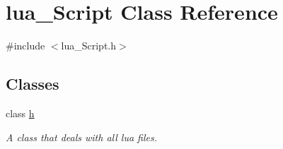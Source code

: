 \hypertarget{classlua___script}{}\section{lua\+\_\+\+Script Class Reference}
\label{classlua___script}


{\ttfamily \#include $<$lua\+\_\+\+Script.\+h$>$}

\subsection*{Classes}
\begin{DoxyCompactItemize}
\item 
class \hyperlink{classlua___script_1_1h}{h}
\begin{DoxyCompactList}\small\item\em A class that deals with all lua files. \end{DoxyCompactList}\end{DoxyCompactItemize}
